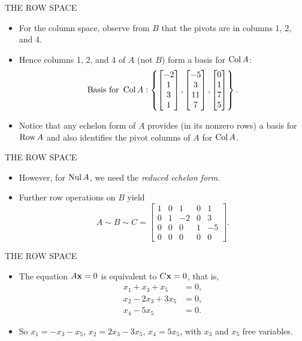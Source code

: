 \begin{frame}[shrink=9]{THE ROW SPACE}
\begin{itemize}
\item For the column space, observe from $B$ that the pivots are in columns 1, 2, and 4.
\item Hence columns 1, 2, and 4 of $A$ (not $B$) form a basis for $\operatorname{Col} A$:
\[
\text{Basis for }\operatorname{Col} A:
\left\{
\begin{bmatrix}-2\\1\\3\\1\end{bmatrix},
\begin{bmatrix}-5\\3\\11\\7\end{bmatrix},
\begin{bmatrix}0\\1\\7\\5\end{bmatrix}
\right\}.
\]
\item Notice that any echelon form of $A$ provides (in its nonzero rows) a basis for $\operatorname{Row} A$ and also identifies the pivot columns of $A$ for $\operatorname{Col} A$.
\end{itemize}
\end{frame}

\begin{frame}{THE ROW SPACE}
\begin{itemize}
\item However, for $\operatorname{Nul} A$, we need the \emph{reduced echelon form}.
\item Further row operations on $B$ yield
\[
A\sim B\sim C=\begin{bmatrix}
1&0&1&0&1\\
0&1&-2&0&3\\
0&0&0&1&-5\\
0&0&0&0&0
\end{bmatrix}.
\]
\end{itemize}
\end{frame}

\begin{frame}[shrink=8]{THE ROW SPACE}
\begin{itemize}
\item The equation $A\mathbf{x}=0$ is equivalent to $C\mathbf{x}=0$, that is,
\begin{align*}
x_1+x_3+x_5&=0,\\
x_2-2x_3+3x_5&=0,\\
x_4-5x_5&=0.
\end{align*}
\item So $x_1=-x_3-x_5$, $x_2=2x_3-3x_5$, $x_4=5x_5$, with $x_3$ and $x_5$ free variables.
\end{itemize}
\end{frame}

